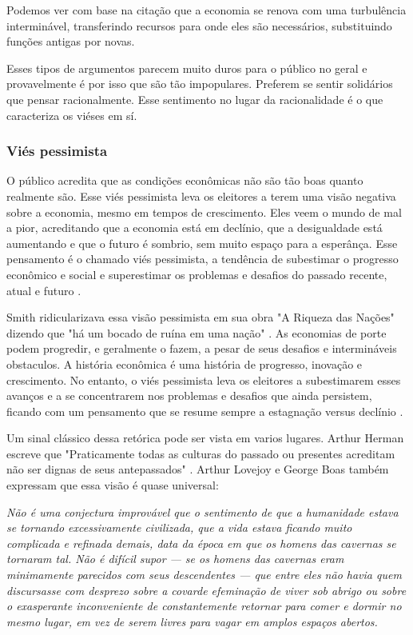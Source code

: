 Podemos ver com base na citação que a economia se renova com uma turbulência interminável, transferindo recursos para onde eles são necessários, substituindo funções antigas por novas.

Esses tipos de argumentos parecem muito duros para o público no geral e provavelmente é por isso que são tão impopulares. Preferem se sentir solidários que pensar racionalmente. Esse sentimento no lugar da racionalidade é o que caracteriza os viéses em sí.

\subsubsection{Viés pessimista}

O público acredita que as condições econômicas não são tão boas quanto realmente são. Esse viés pessimista leva os eleitores a terem uma visão negativa sobre a economia, mesmo em tempos de crescimento. Eles veem o mundo de mal a pior, acreditando que a economia está em declínio, que a desigualdade está aumentando e que o futuro é sombrio, sem muito espaço para a esperânça. Esse pensamento é o chamado viés pessimista, a tendência de subestimar o progresso econômico e social e superestimar os problemas e desafios do passado recente, atual e futuro \cite{The_Myth_of_the_Rational_Voter}.

Smith ridicularizava essa visão pessimista em sua obra "A Riqueza das Nações" dizendo que "há um bocado de ruína em uma nação" \cite{smith1776inquiry}. As economias de porte podem progredir, e geralmente o fazem, a pesar de seus desafios e intermináveis obstaculos. A história econômica é uma história de progresso, inovação e crescimento. No entanto, o viés pessimista leva os eleitores a subestimarem esses avanços e a se concentrarem nos problemas e desafios que ainda persistem, ficando com um pensamento que se resume sempre a estagnação versus declínio \cite{The_Myth_of_the_Rational_Voter}.

Um sinal clássico dessa retórica pode ser vista em varios lugares. Arthur Herman escreve que "Praticamente todas as culturas do passado ou presentes acreditam não ser dignas de seus antepassados" \cite{herman1997idea}. Arthur Lovejoy e George Boas também expressam que essa visão é quase universal:

\begin{citacao}
    \textit{
        Não é uma conjectura improvável que o sentimento de que a humanidade estava se tornando excessivamente civilizada, que a vida estava ficando muito complicada e refinada demais, data da época em que os homens das cavernas se tornaram tal. Não é difícil supor — se os homens das cavernas eram minimamente parecidos com seus descendentes — que entre eles não havia quem discursasse com desprezo sobre a covarde efeminação de viver sob abrigo ou sobre o exasperante inconveniente de constantemente retornar para comer e dormir no mesmo lugar, em vez de serem livres para vagar em amplos espaços abertos.
    } \newline
    \cite{lovejoy_boas_1965}
\end{citacao}

